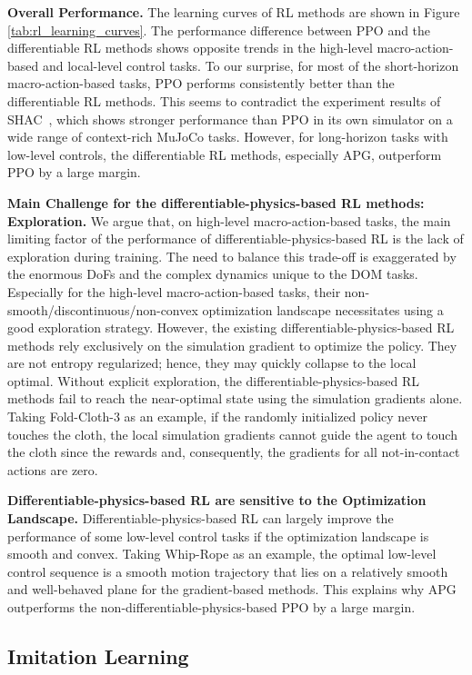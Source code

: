 \textbf{Overall Performance.}
The learning curves of RL methods are shown in Figure \ref{tab:rl_learning_curves}.
The performance difference between PPO and the differentiable RL methods shows opposite trends in the high-level macro-action-based and local-level control tasks. To our surprise, for most of the short-horizon macro-action-based tasks, PPO performs consistently better than the differentiable RL methods. This seems to contradict the experiment results of SHAC~\citep{SHAC}, which shows stronger performance than PPO in its own simulator on a wide range of context-rich MuJoCo tasks.
However, for long-horizon tasks with low-level controls, the differentiable RL methods, especially APG, outperform PPO by a large margin.

\textbf{Main Challenge for the differentiable-physics-based RL methods: Exploration.}
We argue that, on high-level macro-action-based tasks, the main limiting factor of the performance of differentiable-physics-based RL is the lack of exploration during training.
The need to balance this trade-off is exaggerated by the enormous DoFs and the complex dynamics unique to the DOM tasks. Especially for the high-level macro-action-based tasks, their non-smooth/discontinuous/non-convex optimization landscape necessitates using a good exploration strategy. 
However, the existing differentiable-physics-based RL methods rely exclusively on the simulation gradient to optimize the policy. They are not entropy regularized; hence, they may quickly collapse to the local optimal.
Without explicit exploration, the differentiable-physics-based RL methods fail to reach the near-optimal state using the simulation gradients alone. Taking Fold-Cloth-3 as an example, if the randomly initialized policy never touches the cloth, the local simulation gradients cannot guide the agent to touch the cloth since the rewards and, consequently, the gradients for all not-in-contact actions are zero. 

\textbf{Differentiable-physics-based RL are sensitive to the Optimization Landscape.} Differentiable-physics-based RL can largely improve the performance of some low-level control tasks if the optimization landscape is smooth and convex. Taking Whip-Rope as an example, the optimal low-level control sequence is a smooth motion trajectory that lies on a relatively smooth and well-behaved plane for the gradient-based methods. This explains why APG outperforms the non-differentiable-physics-based PPO by a large margin. 

\subsection{Imitation Learning}

